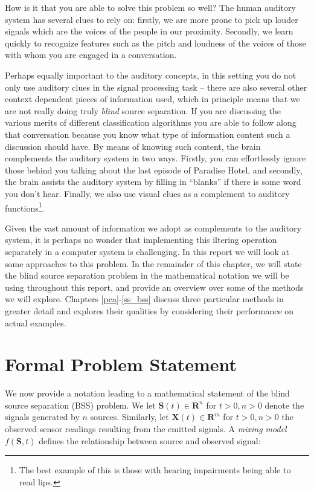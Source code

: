 \documentclass[11pt, oneside, a4paper]{report}
\begin{document}
How is it that you are able to solve this problem so well? The human
auditory system has several clues to rely on: firstly, we are more
prone to pick up louder signals which are the voices of the people in
our proximity. Secondly, we learn quickly to recognize features such
as the pitch and loudness of the voices of those with whom you
are engaged in a conversation.

Perhaps equally important to the auditory concepts, in this setting you do not only use auditory clues in the
signal processing task -- there are also several other context
dependent pieces of information used, which in principle means that we
are not really doing truly \emph{blind} source separation. If you are discussing the various merits of
different classification algorithms you are able to follow along that
conversation because you know what type of information content such a
discussion should have. By  means of knowing such content, the brain
complements the auditory system in two ways. Firstly, you
can effortlessly ignore those behind you talking about the last
episode of Paradise Hotel, and secondly, the brain assists the
auditory system by filling in ``blanks'' if there is some word you
don't hear. Finally, we also use visual clues as a complement to
auditory functions\footnote{The best example of this is those with
  hearing impairments being able to read lips.}. 

Given the vast amount of information we adopt as complements to the auditory system, it is perhaps no wonder that implementing this
iltering operation separately in a computer system is challenging. In
this report we will look at some approaches to this problem. In the
remainder of this chapter, we will state the blind source separation
problem in the mathematical notation we will be using throughout this
report, and provide an overview over some of the methods we will
explore. Chapters \ref{pca}-\ref{ss_bss} discuss three particular
methods in greater detail and explores their qualities by considering
their performance on actual examples.


\section{Formal Problem Statement}

We now provide a notation leading to a mathematical statement of the blind source separation (BSS) problem. We let $\boldsymbol{S}(t)\in \mathbf{R}^n$ for $t>0, n>0$ denote the signals generated by $n$ sources. Similarly, let $\boldsymbol{X}(t)\in \mathbf{R}^m$ for $t>0, n>0$ the observed sensor readings resulting from the emitted signals. A \emph{mixing model} $f(\boldsymbol{S},t)$ defines the relationship between source and observed signal:
\end{document}
